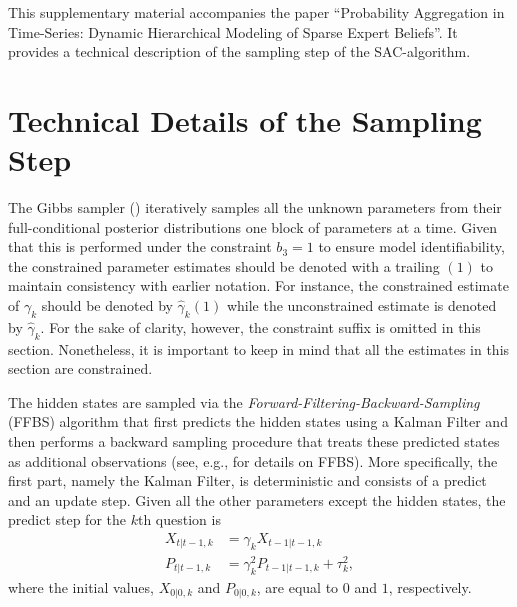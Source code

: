 \documentclass[aoas, preprint]{imsart}
\numberwithin{equation}{section}
\theoremstyle{plain}
\begin{document}
This supplementary material accompanies the paper ``Probability Aggregation in Time-Series: Dynamic Hierarchical Modeling of Sparse Expert Beliefs''. It provides a technical description of the sampling step of the   SAC-algorithm.

\section{Technical Details of the Sampling Step}
\label{appendix}

The Gibbs sampler (\citet{geman1984stochastic}) iteratively samples all the unknown parameters from their full-conditional posterior distributions one block of parameters at a time. Given that this is performed under the constraint $b_3 = 1$ to ensure model identifiability, the constrained parameter estimates should be denoted with a trailing $(1)$ to maintain consistency with earlier notation. For instance, the constrained estimate of $\gamma_k$ should be denoted by $\hat{\gamma}_k(1)$ while the unconstrained estimate is denoted by $\hat{\gamma}_k$. For the sake of clarity, however, the constraint suffix is omitted in this section. Nonetheless, it is important to keep in mind that all the estimates in this section are constrained.

\begin{center}
\end{center}
The hidden states are sampled via the \textit{Forward-Filtering-Backward-Sampling} (FFBS) algorithm that first predicts the hidden states using a Kalman Filter and then performs a backward sampling procedure that treats these predicted states as additional observations (see, e.g., \cite{carter1994gibbs, migon2005dynamic} for details on FFBS). More specifically, the first part, namely the Kalman Filter, is deterministic and consists of a predict and an update step. Given all the other parameters except the hidden states, the predict step for the $k$th question is
\begin{align*}
X_{t|t-1,k} &= \gamma_k X_{t-1|t-1,k} \\
P_{t|t-1, k} &= \gamma_k^2 P_{t-1|t-1, k} + \tau_k^2,
\end{align*}
where the initial values, $X_{0|0,k}$ and $P_{0|0, k}$, are equal to $0$ and $1$, respectively. 
\end{document}
